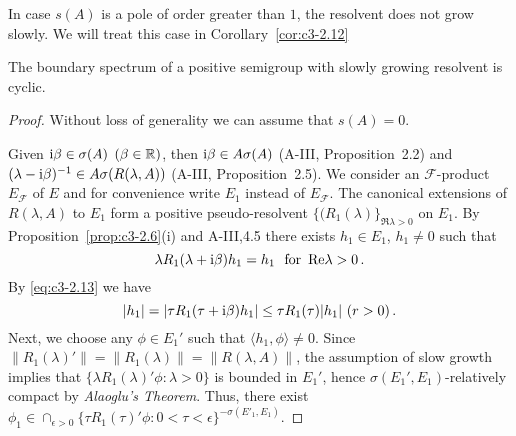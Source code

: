 In case $s(A)$ is a pole of order greater than $1$, the resolvent does not grow slowly.
We will treat this case in Corollary~\ref{cor:c3-2.12}
\begin{theorem}\label{thm:c3-2.10}
	The boundary spectrum of a positive semigroup with slowly growing resolvent is cyclic.
\end{theorem}
\begin{proof}
Without loss of generality we can assume that $s(A) = 0$.

Given $\mathrm{i}\beta \in \sigma(A)$ $(\beta \in \mathbb{R} )$, then $\mathrm{i}\beta \in A\sigma(A)$ (A-III, Proposition~2.2) and $(\lambda-\mathrm{i}\beta)^{-1} \in A\sigma(R(\lambda,A))$ (A-III, Proposition~2.5).
We consider an $\mathcal{F}$-product $E_{\mathcal{F}}$ of $E$ and for convenience write $E_{1}$ instead of $E_{\mathcal{F}}$.
The canonical extensions of $R(\lambda,A)$ to $E_{1}$ form a positive pseudo-resolvent $\{(R_{1}(\lambda)\}_{\Re \lambda>0}$ on $E_{1}$.
By Proposition~\ref{prop:c3-2.6}(i) and A-III,4.5 there exists $h_{1} \in E_{1}$, $h_{1} \neq 0$ such that
\begin{equation}\textstyle\label{eq:c3-2.16}
	\lambda R_{1}(\lambda+\mathrm{i}\beta)h_{1} = h_{1} \ \text{ for }  \mathop{}\!\mathrm{Re} \lambda > 0\,.
\end{equation}
By \eqref{eq:c3-2.13} we have
\begin{equation}\label{eq:c3-2.17}\textstyle
	|h_{1}| = |\tau R_{1}(\tau+\mathrm{i}\beta)h_{1}| \leq \tau R_{1}(\tau)|h_{1}| \ (r > 0)\,.
\end{equation}
Next, we choose any $\phi \in E_{1}'$ such that $\langle  h_{1},\phi \rangle \neq 0$.
Since $\|R_{1}(\lambda)'\| = \|R_{1}(\lambda)\| = \|R(\lambda,A)\|$, the assumption of slow growth implies that $\{\lambda R_{1}(\lambda)'\phi \colon \lambda > 0\}$ is bounded in $E_{1}'$, hence $\sigma(E_{1}',E_{1})$-relatively compact by \emph{Alaoglu's Theorem}.
Thus, there exist $\phi_{1} \in \cap_{\epsilon>0}\{\tau R_{1}(\tau)'\phi \colon 0<\tau<\epsilon\}^{-\sigma(E'_1,E_1)}$.


\end{proof}
